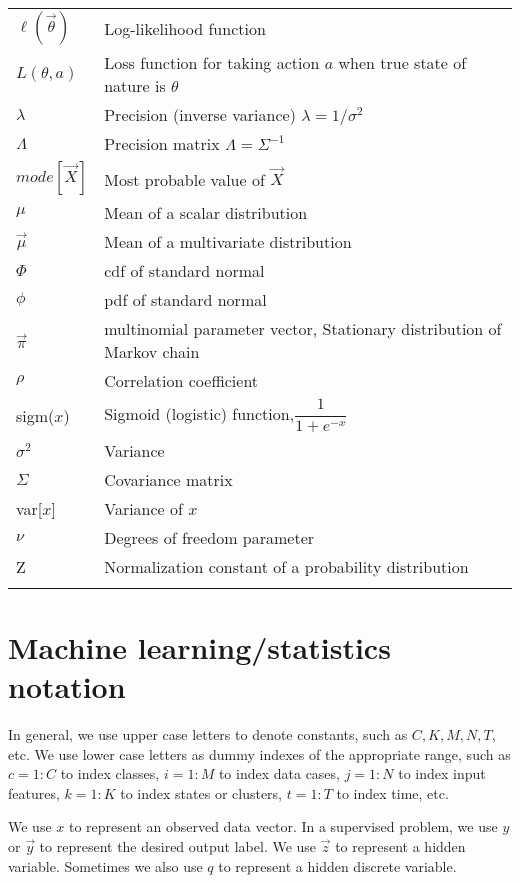 \begin{longtable}{ll}
$\ell(\vec{\theta})$ & Log-likelihood function\\
$L(\theta,a)$ & Loss function for taking action $a$ when true state of nature is $\theta$\\
$\lambda$ & Precision (inverse variance) $\lambda=1/\sigma^2$\\
$\Lambda$ & Precision matrix $\Lambda=\Sigma^{-1}$\\
$mode[\vec X]$ & Most probable value of $\vec X$\\
$\mu$ & Mean of a scalar distribution\\
$\vec{\mu}$ & Mean of a multivariate distribution\\
$\Phi$ & cdf of standard normal\\
$\phi$ & pdf of standard normal\\
$\vec{\pi}$ & multinomial parameter vector, Stationary distribution of Markov chain\\
$\rho$ & Correlation coefficient \\
sigm($x$) & Sigmoid (logistic) function,$\dfrac{1}{1+e^{-x}}$\\
$\sigma^2$ & Variance\\
$\Sigma$ & Covariance matrix\\
var[$x$] & Variance of $x$\\
$\nu$ & Degrees of freedom parameter\\
Z & Normalization constant of a probability distribution\\
\noalign{\smallskip}\hline\noalign{\smallskip}
\end{longtable}

\section*{Machine learning/statistics notation}
In general, we use upper case letters to denote constants, such as $C, K, M, N, T$, etc. We use lower case letters as dummy indexes of the appropriate range, such as $c=1:C$ to index classes, $i=1:M$ to index data cases, $j=1:N$ to index input features, $k=1:K$ to index states or clusters, $t=1:T$ to index time, etc.

We use $x$ to represent an observed data vector. In a supervised problem, we use $y$ or $\vec{y}$ to represent the desired output label. We use $\vec{z}$ to represent a hidden variable. Sometimes we also use $q$ to represent a hidden discrete variable.

